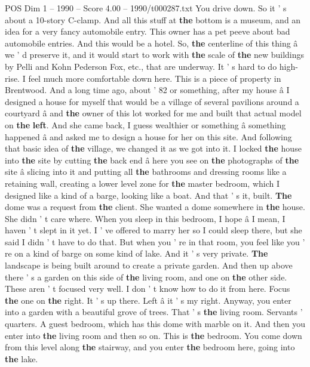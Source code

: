\begin{textsample}{POS Dim 1 – 1990 – Score 4.00 – 1990/t000287.txt}
You drive down.
So it ' s about a 10-story C-clamp.
And all this stuff at \textbf{the} bottom is a museum, and an idea for a very fancy automobile entry.
This owner has a pet peeve about bad automobile entries.
And this would be a hotel.
So, \textbf{the} centerline of this thing â we ' d preserve it, and it would start to work with \textbf{the} scale of \textbf{the} new buildings by Pelli and Kohn Pederson Fox, etc., that are underway.
It ' s hard to do high-rise.
I feel much more comfortable down here.
This is a piece of property in Brentwood.
And a long time ago, about ' 82 or something, after my house â I designed a house for myself that would be a village of several pavilions around a courtyard â and \textbf{the} owner of this lot worked for me and built that actual model on \textbf{the} \textbf{left}.
And she came back, I guess wealthier or something â something happened â and asked me to design a house for her on this site.
And following that basic idea of \textbf{the} village, we changed it as we got into it.
I locked \textbf{the} house into \textbf{the} site by cutting \textbf{the} back end â here you see on \textbf{the} photographs of \textbf{the} site â slicing into it and putting all \textbf{the} bathrooms and dressing rooms like a retaining wall, creating a lower level zone for \textbf{the} master bedroom, which I designed like a kind of a barge, looking like a boat.
And that ' s it, built. \textbf{The} dome was a request from \textbf{the} client.
She wanted a dome somewhere in \textbf{the} house.
She didn ' t care where.
When you sleep in this bedroom, I hope â I mean, I haven ' t slept in it yet.
I ' ve offered to marry her so I could sleep there, but she said I didn ' t have to do that.
But when you ' re in that room, you feel like you ' re on a kind of barge on some kind of lake.
And it ' s very private. \textbf{The} landscape is being built around to create a private garden.
And then up above there ' s a garden on this side of \textbf{the} living room, and one on \textbf{the} other side.
These aren ' t focused very well.
I don ' t know how to do it from here.
Focus \textbf{the} one on \textbf{the} right.
It ' s up there.
Left â it ' s my right.
Anyway, you enter into a garden with a beautiful grove of trees.
That ' s \textbf{the} living room.
Servants ' quarters.
A guest bedroom, which has this dome with marble on it.
And then you enter into \textbf{the} living room and then so on.
This is \textbf{the} bedroom.
You come down from this level along \textbf{the} stairway, and you enter \textbf{the} bedroom here, going into \textbf{the} lake.

\end{textsample}
